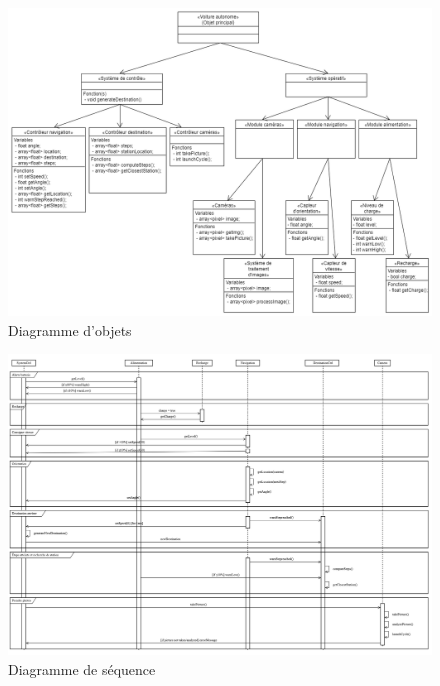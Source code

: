\documentclass[conference]{IEEEtran}
\begin{document}
\begin{figure}[h!]
    \centering
    \includegraphics[width=\paperwidth, angle=90]{objects.png}
    \caption{Diagramme d'objets}
    \label{fig:object}
\end{figure}



\begin{figure}[h!]
    \hspace{-3em}
    \includegraphics[width=1.2\paperwidth, angle=90]{sequence-diagram.png}
    \caption{Diagramme de séquence}
    \label{fig:sequence}
\end{figure}
\end{document}
